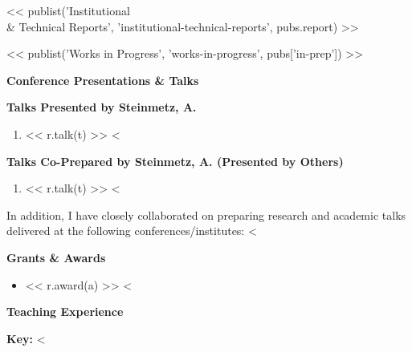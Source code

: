 \documentclass[11pt]{article}
\begin{document}
<< publist('Institutional \\& Technical Reports', 'institutional-technical-reports', pubs.report) >>
\medskip

<< publist('Works in Progress', 'works-in-progress', pubs['in-prep']) >>
\medskip

{\Large\textbf{Conference Presentations \& Talks}}

{\large\textbf{Talks Presented by Steinmetz, A.}}

\begin{enumerate}[leftmargin=*,nosep]
<%
    \item << r.talk(t) >>
<%
\end{enumerate}

{\large\textbf{Talks Co-Prepared by Steinmetz, A. (Presented by Others)}}

\begin{enumerate}[leftmargin=*,nosep]
<%
    \item << r.talk(t) >>
<%
\end{enumerate}

\noindent In addition, I have closely collaborated on preparing research and academic talks delivered at the following conferences/institutes: <%

\medskip

{\Large\textbf{Grants \& Awards}}

\begin{itemize}[leftmargin=*,nosep]
<%
    \item << r.award(a) >>
<%
\end{itemize}

\medskip

{\Large\textbf{Teaching Experience}}

\textbf{Key:} <%
\end{document}
